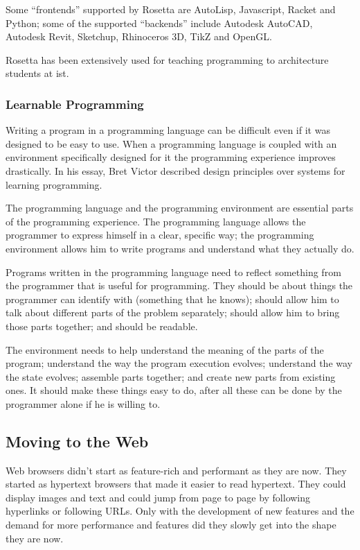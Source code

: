 \documentclass{./llncs2e/llncs}
\begin{document}
	Some ``frontends'' supported by Rosetta are AutoLisp, Javascript, Racket and Python; some of the supported ``backends'' include Autodesk AutoCAD, Autodesk Revit, Sketchup, Rhinoceros 3D, TikZ and OpenGL.
	
	Rosetta has been extensively used for teaching programming to architecture students at \ac{ist}. 

\subsubsection{Learnable Programming\cite{victor2012learnable}}
	Writing a program in a programming language can be difficult even if it was designed to be easy to use. 
	When a programming language is coupled with an environment specifically designed for it the programming experience improves drastically. 
	In his essay\cite{victor2012learnable}, Bret Victor described design principles over systems for learning programming.
	
	The programming language and the programming environment are essential parts of the programming experience.
	The programming language allows the programmer to express himself in a clear, specific way; the programming environment allows him to write programs and understand what they actually do.
	
	Programs written in the programming language need to reflect something from the programmer that is useful for programming.
	They should be about things the programmer can identify with (something that he knows); should allow him to talk about different parts of the problem separately; should allow him to bring those parts together; and should be readable.
	
	The environment needs to help understand the meaning of the parts of the program; understand the way the program execution evolves; understand the way the state evolves; assemble parts together; and create new parts from existing ones.
	It should make these things easy to do, after all these can be done by the programmer alone if he is willing to.

\subsection{Moving to the Web}
	Web browsers didn't start as feature-rich and performant as they are now.
	They started as hypertext browsers that made it easier to read hypertext.
	They could display images and text and could jump from page to page by following hyperlinks or following URLs.
	Only with the development of new features and the demand for more performance and features did they slowly get into the shape they are now.
\end{document}
